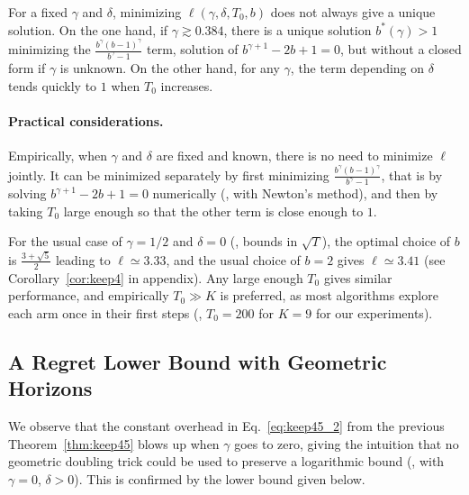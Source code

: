 \documentclass[12pt]{colt2018} %
\begin{document}
For a fixed $\gamma$ and $\delta$, minimizing $\ell(\gamma, \delta, T_0, b)$ does not always give a unique solution.
On the one hand, if $\gamma \gtrsim 0.384$, there is a unique solution $b^*(\gamma) > 1$ minimizing the $\frac{b^{\gamma} (b-1)^{\gamma}}{b^{\gamma} - 1}$ term, solution of $b^{\gamma+1} - 2b + 1 = 0$, but without a closed form if $\gamma$ is unknown.
%
On the other hand, for any $\gamma$, the term depending on $\delta$ tends quickly to $1$ when $T_0$ increases.


\paragraph{Practical considerations.}
%
Empirically, when $\gamma$ and $\delta$ are fixed and known, there is no need to minimize $\ell$ jointly.
%
It can be minimized separately by first minimizing $\frac{b^{\gamma} (b-1)^{\gamma}}{b^{\gamma} - 1}$,
that is by solving $b^{\gamma+1} - 2b + 1 = 0$ numerically (\eg, with Newton's method), and then by taking $T_0$ large enough so that the other term is close enough to $1$.

For the usual case of $\gamma=1/2$ and $\delta=0$ (\ie, bounds in $\sqrt{T}$), the optimal choice of $b$ is $\frac{3+\sqrt{5}}{2}$ leading to $\ell \simeq 3.33$,
and the usual choice of $b=2$ gives $\ell \simeq 3.41$ (see Corollary~\ref{cor:keep4} in appendix).
%
Any large enough $T_0$ gives similar performance, and empirically $T_0 \gg K$ is preferred, as most algorithms explore each arm once in their first steps
(\eg, $T_0 = 200$ for $K=9$ for our experiments).


\subsection{A Regret Lower Bound with Geometric Horizons}\label{sec:lowerboundsGeom}

We observe that the constant overhead in Eq.~\eqref{eq:keep45_2} from the previous Theorem~\ref{thm:keep45} blows up when $\gamma$ goes to zero,
giving the intuition that no geometric doubling trick could be used to preserve a logarithmic bound (\ie, with $\gamma=0$, $\delta>0$).
This is confirmed by the lower bound given below.
\end{document}

